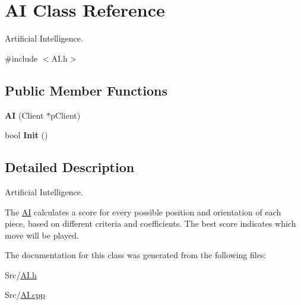 \hypertarget{classAI}{\section{A\-I Class Reference}
\label{classAI}
}


Artificial Intelligence.  




{\ttfamily \#include $<$A\-I.\-h$>$}

\subsection*{Public Member Functions}
\begin{DoxyCompactItemize}
\item 
\hypertarget{classAI_a3552575abc73764ed2a8a9ed8dfbcff9}{{\bfseries A\-I} (Client $\ast$p\-Client)}\label{classAI_a3552575abc73764ed2a8a9ed8dfbcff9}

\item 
\hypertarget{classAI_ad3bbc977f241366c8bd9f6284ccdd0d4}{bool {\bfseries Init} ()}\label{classAI_ad3bbc977f241366c8bd9f6284ccdd0d4}

\end{DoxyCompactItemize}


\subsection{Detailed Description}
Artificial Intelligence. 

The \hyperlink{classAI}{A\-I} calculates a score for every possible position and orientation of each piece, based on different criteria and coefficients. The best score indicates which move will be played. 

The documentation for this class was generated from the following files\-:\begin{DoxyCompactItemize}
\item 
Src/\hyperlink{AI_8h}{A\-I.\-h}\item 
Src/\hyperlink{AI_8cpp}{A\-I.\-cpp}\end{DoxyCompactItemize}

